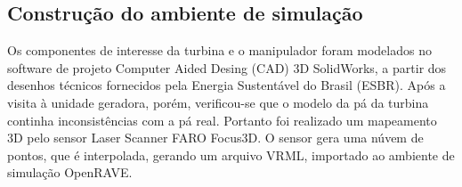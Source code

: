 \subsection{Construção do ambiente de simulação}

Os componentes de interesse da turbina e o manipulador foram modelados no
software de projeto Computer Aided Desing (CAD) 3D SolidWorks, a partir dos
desenhos técnicos fornecidos pela Energia Sustentável do Brasil (ESBR). Após a visita à unidade geradora, porém,
verificou-se que o modelo da pá da turbina continha inconsistências com a pá
real. Portanto foi realizado um mapeamento 3D pelo sensor Laser Scanner FARO
Focus3D. O sensor gera uma núvem de pontos, que é interpolada, gerando um
arquivo VRML, importado ao ambiente de simulação OpenRAVE.
